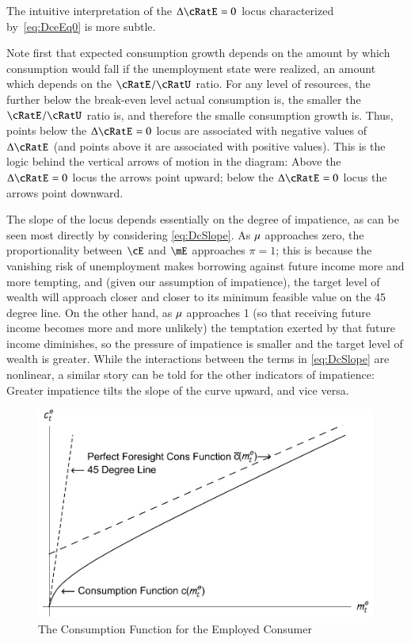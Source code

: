 \documentclass[titlepage,abstract]{\econtex}\newcommand{\texname}{ctDiscrete}
\begin{document}
The intuitive interpretation of the $\Delta \cRatE_{\tSS}=0$ locus characterized by~\eqref{eq:DceEq0} is  more subtle. 

Note first that expected consumption growth depends on the amount by
which consumption would fall if the unemployment state were realized,
an amount which depends on the $\cRatE_{\tSS}/\cRatU_{\tSS}$
ratio. For any level of resources, the further below the break-even
level actual consumption is, the smaller the
$\cRatE_{\tSS}/\cRatU_{\tSS}$ ratio is, and therefore the smalle
consumption growth is. Thus, points below the $\Delta \cRatE_{\tSS}=0$
locus are associated with negative values of $\Delta \cRatE_{\tSS}$
(and points above it are associated with positive values). This is the
logic behind the vertical arrows of motion in the diagram: Above the
$\Delta \cRatE_{\tSS}=0$ locus the arrows point upward; below the
$\Delta \cRatE_{\tSS}=0$ locus the arrows point downward.

The slope of the locus depends essentially on the degree of
impatience, as can be seen most directly by considering
\eqref{eq:DcSlope}.  As $\mu$ approaches zero, the proportionality
between $\cE$ and $\mE$ approaches $\pi=1$; this is because the
vanishing risk of unemployment makes borrowing against future income
more and more tempting, and (given our assumption of impatience), the
target level of wealth will approach closer and closer to its minimum
feasible value on the 45 degree line.  On the other hand, as $\mu$
approaches 1 (so that receiving future income becomes more and more
unlikely) the temptation exerted by that future income diminishes, so
the pressure of impatience is smaller and the target level of wealth
is greater.  While the interactions between the terms in
\eqref{eq:DcSlope} are nonlinear, a similar story can be told for the
other indicators of impatience: Greater impatience tilts the slope of
the curve upward, and vice versa.

\begin{figure}
\caption{The Consumption Function for the Employed Consumer}\label{fig:cFunc}
\includegraphics{./Figures/TractableBufferStockcFunc}
\end{figure}
\end{document}

